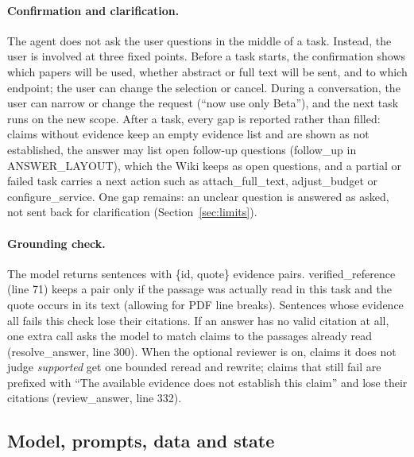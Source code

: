 \documentclass{article}
\newcommand{\code}[1]{{\ttfamily\small\hyphenchar\font=-1\relax #1}}
\begin{document}
\begin{samepage}
\paragraph{Confirmation and clarification.}
The agent does not ask the user questions in the middle of a task. Instead, the user is involved at
three fixed points. Before a task starts, the confirmation shows which papers will be used, whether
abstract or full text will be sent, and to which endpoint; the user can change the selection or
cancel. During a conversation, the user can narrow or change the request (``now use only Beta''), and
the next task runs on the new scope. After a task, every gap is reported rather than filled: claims
without evidence keep an empty evidence list and are shown as not established, the answer may list
open follow-up questions (\code{follow\_up} in \code{ANSWER\_LAYOUT}), which the Wiki keeps as open
questions, and a partial or failed task carries a next action such as \code{attach\_full\_text},
\code{adjust\_budget} or \code{configure\_service}. One gap remains: an unclear question is answered
as asked, not sent back for clarification (Section~\ref{sec:limits}).\par
\end{samepage}

\begin{samepage}
\paragraph{Grounding check.}
The model returns sentences with \code{\{id, quote\}} evidence pairs. \code{verified\_reference}
(line 71) keeps a pair only if the passage was actually read in this task and the quote occurs in its
text (allowing for PDF line breaks). Sentences whose evidence all fails this check lose their
citations. If an answer has no valid citation at all, one extra call asks the model to match claims to
the passages already read (\code{resolve\_answer}, line 300). When the optional reviewer is on, claims
it does not judge \emph{supported} get one bounded reread and rewrite; claims that still fail are
prefixed with ``The available evidence does not establish this claim'' and lose their citations
(\code{review\_answer}, line 332).\par
\end{samepage}

\subsection{Model, prompts, data and state}
\end{document}
